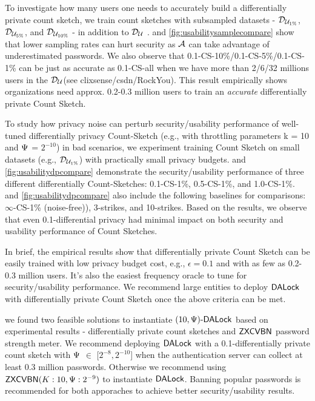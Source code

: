 To investigate how many users one needs to accurately build a differentially private count sketch, we train count sketches with subsampled datasets - $\mathcal{D}_{{\mathcal{U}_{1\%}}}$, $\mathcal{D}_{{\mathcal{U}_{5\%}}}$, and $\mathcal{D}_{{\mathcal{U}_{10\%}}}$ - in addition to $\mathcal{D}_{{\mathcal{U}}}$ .  and \ref{fig:usabilitysamplecompare} show that lower sampling rates can hurt security as $\mathcal{A}$ can take advantage of underestimated passwords. We also observe that  0.1-CS-10\%/0.1-CS-5\%/0.1-CS-1\% can be just as accurate as 0.1-CS-all when we have more than 2/6/32 millions users in the $\mathcal{D}_{{\mathcal{U}}}$(see clixsense/csdn/RockYou). This result empirically shows organizations need approx. 0.2-0.3 million users to train an \textit{accurate} differentially private Count Sketch. 

To study how privacy noise can perturb security/usability performance of well-tuned differentially privacy Count-Sketch (e.g., with throttling parameters k = 10 and $\Psi$ = $2^{-10}$) in bad scenarios, we experiment training Count Sketch on small datasets (e.g., $\mathcal{D}_{{\mathcal{U}_{1\%}}}$) with practically small privacy budgets.  and \ref{fig:usabilitydpcompare} demonstrate the security/usability performance of three different differentially Count-Sketches: 0.1-CS-1\%, 0.5-CS-1\%, and 1.0-CS-1\%.   and \ref{fig:usabilitydpcompare} also include the following baselines for comparisons: $\infty$-CS-1\% (noise-free)), 3-strikes, and 10-strikes. Based on the results, we observe that even 0.1-differential privacy had minimal impact on both security and usability performance of Count Sketches. 

In brief, the empirical results show that differentially private Count Sketch can be easily trained with low privacy budget cost, e.g., $\epsilon = 0.1$ and with as few as 0.2-0.3 million users. It's also the easiest frequency oracle to tune for security/usability performance. We recommend large entities to deploy $\mathsf{DALock}$ with differentially private Count Sketch once the above criteria can be met.

 we found two feasible solutions to instantiate $(10, \Psi)\text{-}\mathsf{DALock}$ based on experimental results - differentially private count sketches and $\mathsf{ZXCVBN}$ password strength meter. We recommend deploying $\mathsf{DALock}$ with a 0.1-differentially private count sketch with $\Psi$ $\in$ [$2^{-8},2^{-10}$] when the authentication server can collect at least 0.3 million passwords. Otherwise we recommend using $\mathsf{ZXCVBN}(K:10,\Psi:2^{-9})$ to instantiate $\mathsf{DALock}$. Banning popular passwords is recommended for both apporaches to achieve better security/usability results. 

